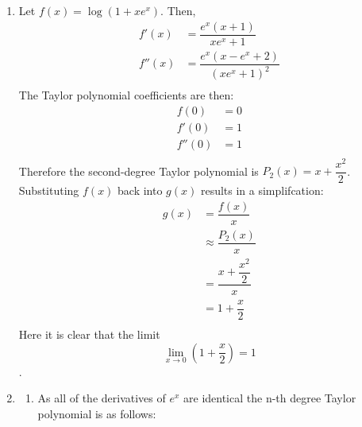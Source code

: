 \documentclass{article}
\begin{document}
\begin{enumerate}
\begin{enumerate}
        \end{enumerate}
    \item
        Let $f(x) = \log{\left(1+xe^x\right)}$. Then, \\
        \begin{equation*}
        \begin{split}
            f'(x) & = \dfrac{e^x(x+1)}{xe^x+1} \\
            f''(x) & = \dfrac{e^x(x-e^x+2)}{(xe^x+1)^2} \\
        \end{split}
        \end{equation*}
        The Taylor polynomial coefficients are then: \\
        \begin{equation*}
        \begin{split}
            f(0) & = 0 \\
            f'(0) & = 1 \\
            f''(0) & = 1 \\
        \end{split}
        \end{equation*}
        Therefore the second-degree Taylor polynomial is $P_2(x) = x + \dfrac{x^2}{2}$. \\
        Substituting $f(x)$ back into $g(x)$ results in a simplifcation: \\
        \begin{equation*}
        \begin{split}
            g(x) & = \dfrac{f(x)}{x} \\
                 & \approx \dfrac{P_2(x)}{x} \\
                 & = \dfrac{x + \dfrac{x^2}{2}}{x} \\
                 & = 1 + \dfrac{x}{2} \\
        \end{split}
        \end{equation*}
        Here it is clear that the limit $$\lim_{x \to 0} \left(1 + \dfrac{x}{2}\right) = 1$$. \\
    \item
        \begin{enumerate}
            \item
                As all of the derivatives of $e^x$ are identical the n-th degree Taylor polynomial is as follows: \\
                \begin{equation*}
                \begin{split}

\end{split}
\end{equation*}
\end{enumerate}
\end{enumerate}
\end{document}
